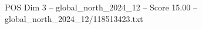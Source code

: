 \begin{textsample}{POS Dim 3 – global\_north\_2024\_12 – Score 15.00 – global\_north\_2024\_12/118513423.txt}
\end{textsample}
